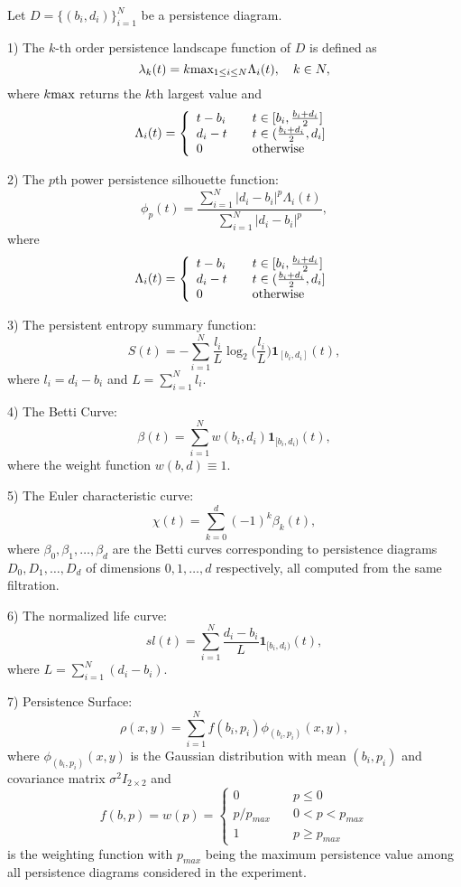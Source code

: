 \documentclass{article}
\begin{document}
Let $D=\{(b_i,d_i)\}_{i=1}^N$ be a persistence diagram. 

1) The $k$-th order persistence landscape function of $D$ is defined as $$\lambda_k(t) = k\hbox{max}_{1\leq i \leq N} \Lambda_i(t), \quad k\in N,$$
where $k\hbox{max}$ returns the $k$th largest value and 
$$\Lambda_i(t) = \left\{
        \begin{array}{ll}
            t-b_i & \quad t\in [b_i,\frac{b_i+d_i}{2}] \\
            d_i-t & \quad t\in (\frac{b_i+d_i}{2},d_i]\\
            0 & \quad \hbox{otherwise}
        \end{array}
    \right.$$

2) The $p$th power persistence silhouette function:
$$\phi_p(t) = \frac{\sum_{i=1}^N |d_i-b_i|^p\Lambda_i(t)}{\sum_{i=1}^N |d_i-b_i|^p},$$
where
$$\Lambda_i(t) = \left\{
        \begin{array}{ll}
            t-b_i & \quad t\in [b_i,\frac{b_i+d_i}{2}] \\
            d_i-t & \quad t\in (\frac{b_i+d_i}{2},d_i]\\
            0 & \quad \hbox{otherwise}
        \end{array}
    \right.$$

3) The persistent entropy summary function:
$$
S(t)=-\sum_{i=1}^N \frac{l_i}{L}\log_2{(\frac{l_i}{L}})\mathbf 1_{[b_i,d_i]}(t),
$$ where $l_i=d_i-b_i$ and $L=\sum_{i=1}^Nl_i$.

4) The Betti Curve: 
$$
\beta(t)=\sum_{i=1}^N w(b_i,d_i)\mathbf 1_{[b_i,d_i)}(t),
$$ where the weight function $w(b,d)\equiv 1$.

5) The Euler characteristic curve: 
$$
\chi(t)=\sum_{k=0}^d (-1)^k\beta_k(t),
$$ where $\beta_0,\beta_1,\ldots,\beta_d$ are the Betti curves corresponding to persistence diagrams $D_0,D_1,\ldots,D_d$ of dimensions $0,1,\ldots,d$ respectively, all computed from the same filtration.

6) The normalized life curve: 
$$
sl(t)=\sum_{i=1}^N \frac{d_i-b_i}{L}\mathbf{1}_{[b_i,d_i)}(t),
$$ where $L=\sum_{i=1}^N (d_i-b_i)$.

7) Persistence Surface:
$$\rho(x,y)=\sum_{i=1}^N f(b_i,p_i)\phi_{(b_i,p_i)}(x,y),$$ where $\phi_{(b_i,p_i)}(x,y)$ is 
the Gaussian distribution with mean $(b_i,p_i)$ and 
covariance matrix $\sigma^2 I_{2\times 2}$ and 
$$
f(b,p) = w(p)=\left\{
        \begin{array}{ll}
            0 & \quad p\leq 0 \\
            p/p_{max} & \quad 0<p<p_{max}\\
            1& \quad p\geq p_{max}
        \end{array}
    \right.
$$
is the weighting function with $p_{max}$ being the maximum persistence value among all persistence diagrams considered in the experiment.
\end{document}
